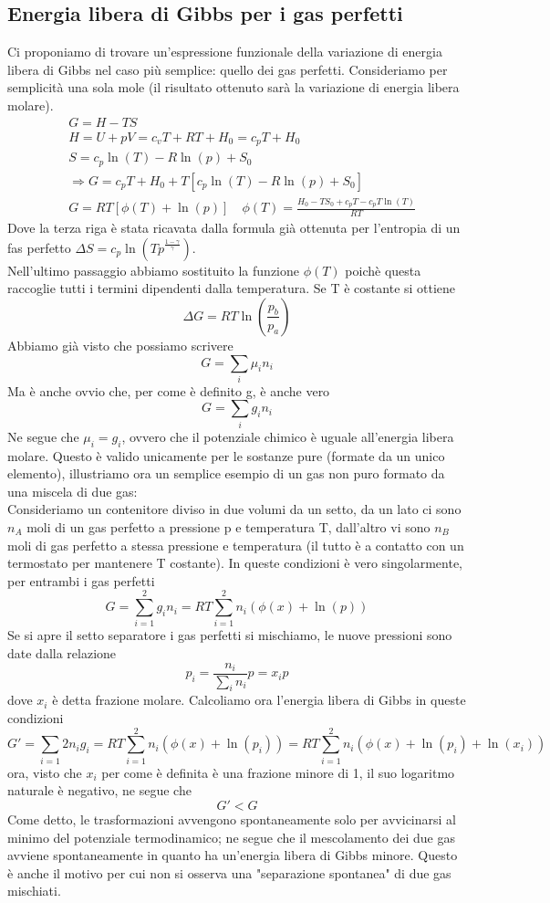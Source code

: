 \documentclass[10pt,a4paper]{article}
\begin{document}
\subsection{Energia libera di Gibbs per i gas perfetti}
Ci proponiamo di trovare un'espressione funzionale della variazione di energia libera di Gibbs nel caso più semplice: quello dei gas perfetti. Consideriamo per semplicità una sola mole (il risultato ottenuto sarà la variazione di energia libera molare).
\begin{align*}
	&G = H-TS\\
	&H=U+pV=c_v T + RT + H_0 = c_p T +H_0\\
	&S=c_p\ln(T)-R\ln(p)+S_0\\
	&\Rightarrow G = c_p T+H_0+T[c_p\ln(T)-R\ln(p)+S_0]\\
	&G=RT[\phi(T)+\ln(p)] \quad \phi(T) = \frac{H_0-TS_0+c_pT-c_pT\ln(T)}{RT}
\end{align*} 
Dove la terza riga è stata ricavata dalla formula già ottenuta per l'entropia di un fas perfetto \(\Delta S = c_p\ln(Tp^{\frac{1-\gamma}{\gamma}})\).\\
Nell'ultimo passaggio abbiamo sostituito la funzione $\phi(T)$ poichè questa raccoglie tutti i termini dipendenti dalla temperatura. Se T è costante si ottiene
\[\Delta G = RT\ln\left(\frac{p_b}{p_a}\right)\]
Abbiamo già visto che possiamo scrivere
\[G = \sum_i \mu_i n_i\]
Ma è anche ovvio che, per come è definito g, è anche vero
\[G = \sum_i g_i n_i\]
Ne segue che \(\mu_i = g_i\), ovvero che il potenziale chimico è uguale all'energia libera molare. Questo è valido unicamente per le sostanze pure (formate da un unico elemento), illustriamo ora un semplice esempio di un gas non puro formato da una miscela di due gas:\\
Consideriamo un contenitore diviso in due volumi da un setto, da un lato ci sono \(n_A\) moli di un gas perfetto a pressione p e temperatura T, dall'altro vi sono \(n_B\) moli di gas perfetto a stessa pressione e temperatura (il tutto è a contatto con un termostato per mantenere T costante). In queste condizioni è vero singolarmente, per entrambi i gas perfetti
\[G=\sum_{i=1}^2 g_i n_i=RT\sum_{i=1}^2n_i(\phi(x)+\ln(p))\]
Se si apre il setto separatore i gas perfetti si mischiamo, le nuove pressioni sono date dalla relazione 
\[p_i = \frac{n_i}{\sum_i n_i}p=x_i p\]
dove \(x_i\) è detta frazione molare. Calcoliamo ora l'energia libera di Gibbs in queste condizioni
\[G'=\sum_{i=1}2 n_ig_i = RT\sum_{i=1}^2 n_i(\phi(x)+\ln(p_i))=RT\sum_{i=1}^2 n_i(\phi(x)+\ln(p_i)+\ln(x_i))\]
ora, visto che \(x_i\) per come è definita è una frazione minore di 1, il suo logaritmo naturale è negativo, ne segue che
\[G'<G\]
Come detto, le trasformazioni avvengono spontaneamente solo per avvicinarsi al minimo del potenziale termodinamico; ne segue che il mescolamento dei due gas avviene spontaneamente in quanto ha un'energia libera di Gibbs minore. Questo è anche il motivo per cui non si osserva una "separazione spontanea" di due gas mischiati. 
\end{document}
